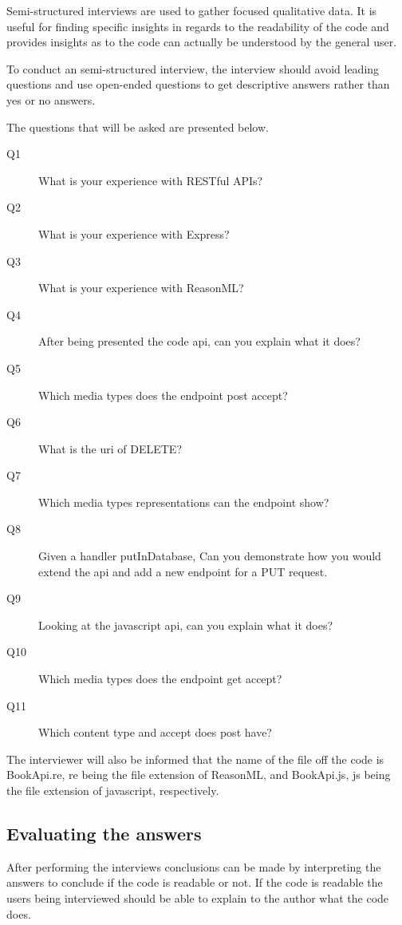 Semi-structured interviews are used to gather focused qualitative data. It is
useful for finding specific insights in regards to the readability of the code
and provides insights as to the code can actually be understood by the general
user.

To conduct an semi-structured interview, the interview should avoid leading
questions and use open-ended questions to get descriptive answers rather than
yes or no answers. 

The questions that will be asked are presented below.

\begin{description}
    \item[Q1] What is your experience with RESTful APIs?
    \item[Q2] What is your experience with Express?
    \item[Q3] What is your experience with ReasonML?
    \item[Q4] After being presented the code api, can you explain what it does?
    \item[Q5] Which media types does the endpoint post accept?
    \item[Q6] What is the uri of DELETE?
    \item[Q7] Which media types representations can the endpoint show?
    \item[Q8] Given a handler putInDatabase, Can you demonstrate how you would
        extend the api and add a new endpoint for a PUT request.
    \item[Q9] Looking at the javascript api, can you explain what it does?
    \item[Q10] Which media types does the endpoint get accept?
    \item[Q11] Which content type and accept does post have?
\end{description}

The interviewer will also be informed that the name of the file off the code is
BookApi.re, re being the file extension of ReasonML, and BookApi.js, js being
the file extension of javascript, respectively. 

\subsection{Evaluating the answers}

After performing the interviews conclusions can be made by interpreting the
answers to conclude if the code is readable or not. If the code is readable the
users being interviewed should be able to explain to the author what the code
does.

